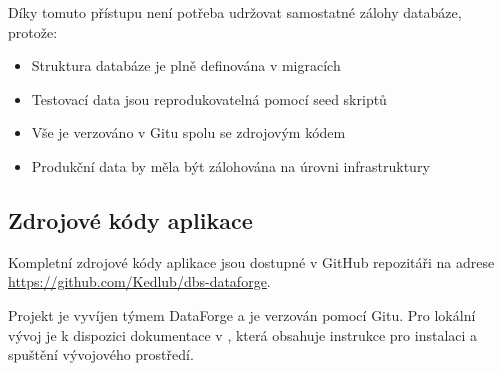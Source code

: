 \documentclass[12pt, a4paper]{article}
\begin{document}
Díky tomuto přístupu není potřeba udržovat samostatné zálohy databáze, protože:
\begin{itemize}
    \item Struktura databáze je plně definována v migracích
    \item Testovací data jsou reprodukovatelná pomocí seed skriptů
    \item Vše je verzováno v Gitu spolu se zdrojovým kódem
    \item Produkční data by měla být zálohována na úrovni infrastruktury
\end{itemize}

\subsection{Zdrojové kódy aplikace}
\label{subsec:zdrojove_kody}

Kompletní zdrojové kódy aplikace jsou dostupné v GitHub repozitáři na adrese \url{https://github.com/Kedlub/dbs-dataforge}. 

Projekt je vyvíjen týmem DataForge a je verzován pomocí Gitu. Pro lokální vývoj je k dispozici dokumentace v , která obsahuje instrukce pro instalaci a spuštění vývojového prostředí.

\end{document}
